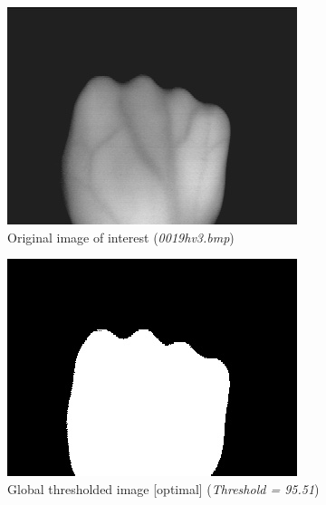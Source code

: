 \documentclass[letterpaper, 12 pt, conference ,onecolumn]{ieeeconf}  %
\begin{document}
\begin{figure}[h!]
\centering
\includegraphics[width=0.4\paperwidth]{optimal-thresholding/global/hand-original-image.jpg}
\caption{Original image of interest (\textit{0019hv3.bmp}) }
\label{fig:hand-original-image}
\end{figure}


\begin{figure}[h!]
\includegraphics[width=0.4\paperwidth]{optimal-thresholding/global/hand-global-threshold.jpg}
\centering
\caption{Global thresholded image [optimal] (\textit{Threshold = 95.51}) }
\label{fig:hand-global-threshold}
\end{figure}
\end{document}
